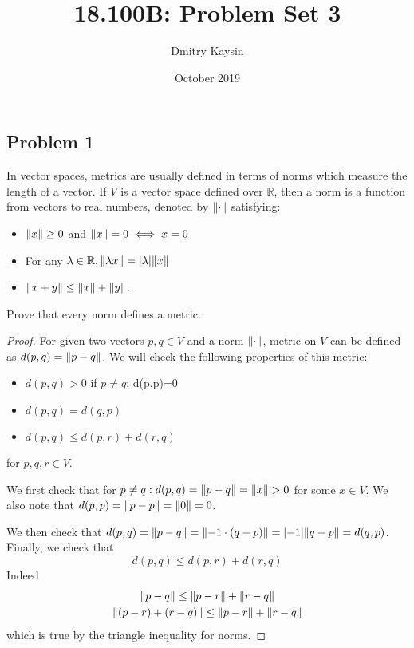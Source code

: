 \documentclass{article}
\title{18.100B: Problem Set 3}
\author{Dmitry Kaysin}
\date{October 2019}
\newcommand{\R}{\mathbb{R}}
\DeclarePairedDelimiter{\norm}{\lVert}{\rVert}
\DeclarePairedDelimiter{\abs}{\lvert}{\rvert}
\begin{document}
\maketitle 


\subsection*{Problem 1}

\begin{tcolorbox}
In vector spaces, metrics are usually defined in terms of norms which measure the length
of a vector.
If $V$ is a vector space defined over $\R$, then a norm is a function from vectors to real numbers, denoted by $\norm{ \cdot }$ satisfying:\\
\begin{itemize}
    \item $\norm{x} \geq 0$ and $\norm{x}=0 \iff x = 0$
    \item For any $\lambda \in \R, \norm{ \lambda x} = \abs{ \lambda } \norm{ x } $
    \item $\norm{ x+y } \leq \norm{x} + \norm{y }$.
\end{itemize}
Prove that every norm defines a metric.
\end{tcolorbox}

\begin{proof}

For given two vectors $p, q \in V$ and a norm $\norm{ \cdot }$, metric on $V$ can be defined as $d(p, q) = \norm{ p-q }$.
We will check the following properties of this metric:
\begin{itemize}
    \item $d(p, q) > 0$ if $p \neq q$; d(p,p)=0
    \item $d(p, q) = d(q, p)$
    \item $d(p, q) \leq d(p, r) + d(r, q)$
\end{itemize}
for $p, q, r \in V$.

We first check that for $p \neq q : d(p, q) = \norm{ p-q } = \norm{ x } > 0$ for some $x \in V$. We also note that $d(p, p) = \norm{ p-p } = \norm{ 0 } = 0$.

We then check that $d(p, q) = \norm{ p-q } = \norm{ -1 \cdot (q-p) } = \abs{-1} \norm{ q-p } = d (q, p)$.
Finally, we check that 
\[ d(p, q) \leq d(p, r) + d(r, q) \]
Indeed
\begin{gather*}
    \norm{ p-q } \leq \norm{ p-r } + \norm{ r-q } \\ 
    \norm{ (p-r) + (r-q) } \leq \norm{ p-r } + \norm{ r-q }    
\end{gather*}
which is true by the triangle inequality for norms.

\end{proof}
\end{document}
